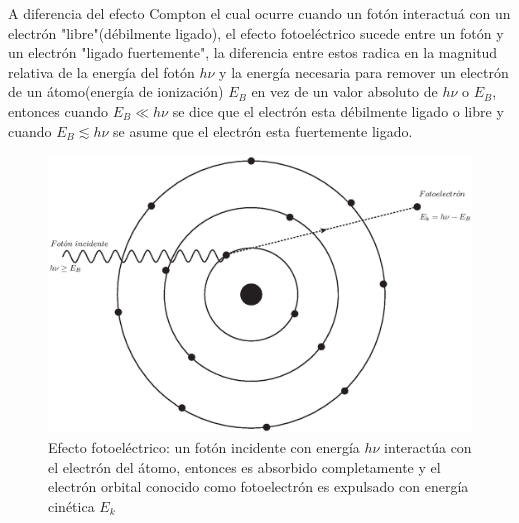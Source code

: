 A diferencia del efecto Compton el cual ocurre cuando un fotón interactuá con un electrón "libre"(débilmente ligado), el efecto fotoeléctrico sucede entre un fotón y un electrón "ligado fuertemente", la diferencia entre estos radica en la magnitud relativa de la energía del fotón $h\nu$ y la energía necesaria para remover un electrón de un átomo(energía de ionización) $E_B$ en vez de un valor absoluto de $h\nu$ o $E_B$, entonces cuando $E_B\ll h\nu$ se dice que el electrón esta débilmente ligado o libre y cuando  $E_B \lesssim h\nu$ se asume que el electrón esta fuertemente ligado\cite{Podgorsak}.


\begin{figure}[htbp]
    \centering
    \includegraphics[width=.71\linewidth]{./Figures/fotoelec.eps}
    \caption[Efecto fotoeléctrico]{Efecto fotoeléctrico: un fotón incidente con energía $h\nu$ interactúa con el electrón del átomo, entonces es absorbido completamente y el electrón orbital conocido como fotoelectrón es expulsado con energía cinética $E_k$}
    \label{fig:UoC}
\end{figure}

